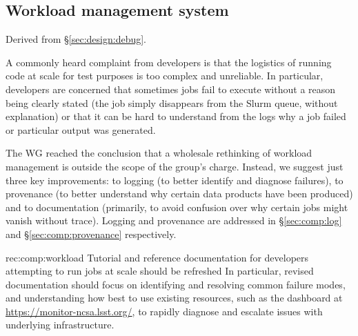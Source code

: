\subsection{Workload management system}
\label{sec:comp:workload}

Derived from \S\ref{sec:design:debug}.

A commonly heard complaint from developers is that the logistics of running code at scale for test purposes is too complex and unreliable.
In particular, developers are concerned that sometimes jobs fail to execute without a reason being clearly stated (the job simply disappears from the Slurm queue, without explanation) or that it can be hard to understand from the logs why a job failed or particular output was generated.

The WG reached the conclusion that a wholesale rethinking of workload management is outside the scope of the group's charge.
Instead, we suggest just three key improvements: to logging (to better identify and diagnose failures), to provenance (to better understand why certain data products have been produced) and to documentation (primarily, to avoid confusion over why certain jobs might vanish without trace). Logging and provenance are addressed in \S\ref{sec:comp:log} and \S\ref{sec:comp:provenance} respectively.

\begin{recommendation}
  {rec:comp:workload}
  {Tutorial and reference documentation for developers attempting to run jobs at scale should be refreshed}
  In particular, revised documentation should focus on identifying and resolving common failure modes, and understanding how best to use existing resources, such as the dashboard at \url{https://monitor-ncsa.lsst.org/}, to rapidly diagnose and escalate issues with underlying infrastructure.
\end{recommendation}
